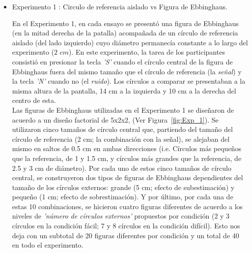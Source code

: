 \begin{itemize}
\item Experimento 1 : Circulo de referencia aislado vs Figura de Ebbinghaus.

En el Experimento 1, en cada ensayo se presentó una figura de Ebbinghaus (en la mitad derecha de la patalla) acompañada de un círculo de referencia aislado (del lado izquierdo) cuyo diámetro permanecía constante a lo largo del experimento ($2$ $cm$). En este experimento, la tarea de los participantes consistió en presionar la tecla \textit{'S'} cuando el círculo central de la figura de Ebbinghaus fuera del mismo tamaño que el círculo de referencia (la \textit{señal}) y la tecla \textit{'N'} cuando no (el \textit{ruido}). Los círculos a comparar se presentaban a la misma altura de la pantalla, 14 cm a la izquierda y 10 cm a la derecha del centro de esta.\\

Las figuras de Ebbinghaus utilizadas en el Experimento 1 se diseñaron de acuerdo a un diseño factorial de 5x2x2, (Ver Figura~\ref{fig:Exp_1}). Se utilizaron cinco tamaños de círculo central que, partiendo del tamaño del círculo de referencia (2 cm; la combinación con la señal), se alejaban del mismo en saltos de 0.5 cm en ambas direcciones (i.e. Círculos más pequeños que la referencia, de 1 y 1.5 cm, y círculos más grandes que la referencia, de 2.5 y 3 cm de diámetro). Por cada uno de estos cinco tamaños de círculo central, se construyeron dos tipos de figuras de Ebbinghaus dependientes del tamaño de los círculos externos: grande (5 cm; efecto de subestimación) y pequeño (1 cm; efecto de sobrestimación). Y por último, por cada una de estas 10 combinaciones, se hicieron cuatro figuras diferentes de acuerdo a los niveles de \textit{'número de círculos externos'} propuestos por condición (2 y 3 círculos en la condición fácil; 7 y 8 círculos en la condición difícil). Esto nos deja con un subtotal de 20 figuras diferentes por condición y un total de 40 en todo el experimento.\\
 

\end{itemize}
